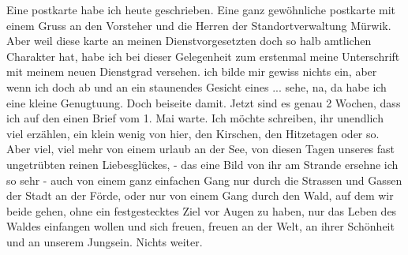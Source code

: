 \def\day{15. Juli 1943.}
\mktitle

Eine postkarte habe ich heute geschrieben.
Eine ganz gew\"{o}hnliche postkarte mit einem Gruss an den Vorsteher und die Herren der Standortverwaltung M\"{u}rwik.
Aber weil diese karte an meinen Dienstvorgesetzten doch so halb amtlichen Charakter hat, habe ich bei dieser Gelegenheit zum erstenmal meine Unterschrift mit meinem neuen Dienstgrad versehen.
ich bilde mir gewiss nichts ein, aber wenn ich doch ab und an ein staunendes Gesicht eines ... sehe, na, da habe ich eine kleine Genugtuung.
Doch beiseite damit.
Jetzt sind es genau 2 Wochen, dass ich auf den einen Brief vom 1. Mai warte.
Ich m\"{o}chte schreiben, ihr unendlich viel erz\"{a}hlen, ein klein wenig von hier, den Kirschen, den Hitzetagen oder so.
Aber viel, viel mehr von einem urlaub an der See, von diesen Tagen unseres fast ungetr\"{u}bten reinen Liebesgl\"{u}ckes, - das eine Bild von ihr am Strande ersehne ich so sehr - auch von einem ganz einfachen Gang nur durch die Strassen und Gassen der Stadt an der F\"{o}rde, oder nur von einem Gang durch den Wald, auf dem wir beide gehen, ohne ein festgestecktes Ziel vor Augen zu haben, nur das Leben des Waldes einfangen wollen und sich freuen, freuen an der Welt, an ihrer Sch\"{o}nheit und an unserem Jungsein.
Nichts weiter.

\clearpage
